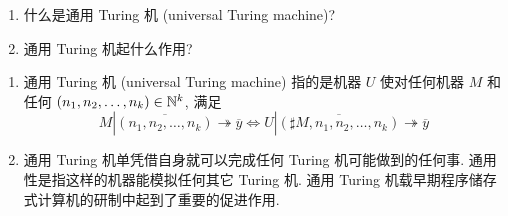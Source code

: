 \begin{problem}
\begin{enumerate}
\item 什么是通用 Turing 机 (universal Turing machine)?
\item 通用 Turing 机起什么作用?
\end{enumerate}
\end{problem}

\begin{solution}
\begin{enumerate}
\item 通用 Turing 机 (universal Turing machine) 指的是机器 $U$ 使对任何机器 $M$ 和任何 $(n_1, n_2, \dots, n_k) \in \mathbb{N}^{k}$, 满足
\[
M | \overline{(n_1, n_2, \dots, n_k)} \twoheadrightarrow \overline{y} \Leftrightarrow U | \overline{(\sharp M, n_1, n_2, \dots, n_k)} \twoheadrightarrow \overline{y}
\]
\item 通用 Turing 机单凭借自身就可以完成任何 Turing 机可能做到的任何事. 通用性是指这样的机器能模拟任何其它 Turing 机. 通用 Turing 机载早期程序储存式计算机的研制中起到了重要的促进作用.
\end{enumerate}
\end{solution}